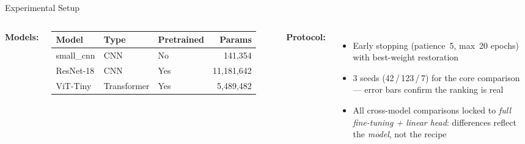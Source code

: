 \documentclass{beamer}
\begin{document}
\begin{frame}{Experimental Setup}

  \begin{columns}

      \textbf{Models:}

      \medskip
      \small
      \renewcommand{\arraystretch}{1.3}
      \begin{tabular}{@{}lllr@{}}
        \toprule
        Model      & Type        & Pretrained & Params \\
        \midrule
        small\_cnn & CNN         & No  & 141{,}354 \\
        ResNet-18  & CNN         & Yes & 11{,}181{,}642 \\
        ViT-Tiny   & Transformer & Yes & 5{,}489{,}482 \\
        \bottomrule
      \end{tabular}


      \textbf{Protocol:}
      \begin{itemize}
        \item Early stopping (patience~5, max~20 epochs) with best-weight restoration
        \item 3 seeds (42\,/\,123\,/\,7) for the core comparison --- error bars confirm the ranking is real
        \item All cross-model comparisons locked to \emph{full fine-tuning + linear head}: differences reflect the \emph{model}, not the recipe
      \end{itemize}

  \end{columns}


\end{frame}
\end{document}
